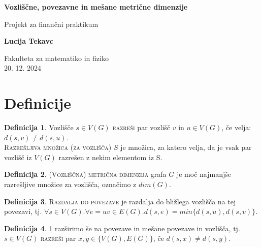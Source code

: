 \documentclass[a4paper,12pt]{article}
\theoremstyle{definition}
\newtheorem{definicija}{Definicija}[section]
\theoremstyle{remark}
\theoremstyle{definition}
\begin{document}
\begin{titlepage}
    \begin{center}
        \vspace*{5cm}
            
        \Huge
        \textbf{Vozliščne, povezavne in mešane metrične dimenzije}
            
        \vspace{0.5cm}
        \LARGE
        Projekt za finančni praktikum
            
        \vspace{1.5cm}
            
        \textbf{Lucija Tekavc}
            
        \vfill
      
        \Large
        Fakulteta za matematiko in fiziko\\
        20. 12. 2024
    \end{center}
\end{titlepage}


\section*{Definicije}

\begin{definicija}\label{def1}
    Vozlišče $s \in V(G)$ \textsc{razreši} par vozlišč $v$ in $u \in V(G)$,
    če velja: $d(s, v) \neq d(s, u)$. \\
    \textsc{Razrešljiva množica (za vozlišča)} $S$ je množica, za katero velja, da je
    vsak par vozlišč iz $V(G)$ razrešen z nekim elementom iz S.
\end{definicija}

\begin{definicija}
    \textsc{(Vozliščna) metrična dimenzija} grafa $G$ je moč najmanjše
    razrešljive množice za vozlišča, označimo z $dim(G)$.
\end{definicija}

\begin{definicija}
    \textsc{Razdalja do povezave} je razdalja do bližlega vozlišča na tej 
    povezavi, tj. $\forall s \in V(G). \forall e = uv \in E(G).d(s, e)=min\{d(s,u),d(s,v)\}$.
\end{definicija}

\begin{definicija}
    \ref{def1} razširimo še na povezave in mešane povezave in vozlišča, tj.
    $s \in V(G)$ \textsc{razreši} par $x, y \in \{V(G), E(G)\}$, če
    $d(s, x) \neq d(s, y)$.
\end{definicija}
\end{document}
